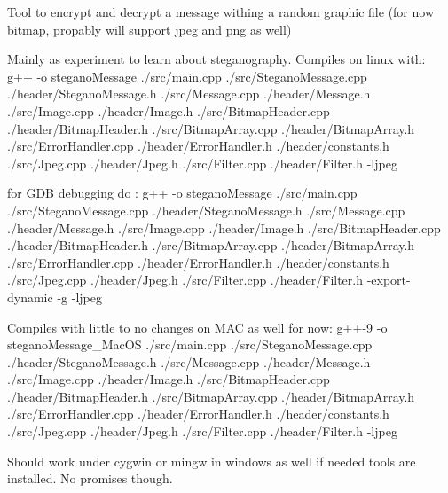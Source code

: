 Tool to encrypt and decrypt a message withing a random graphic file (for now bitmap, propably will support jpeg and png as well)

Mainly as experiment to learn about steganography. Compiles on linux with\+: g++ -\/o stegano\+Message ./src/main.cpp ./src/\+Stegano\+Message.cpp ./header/\+Stegano\+Message.h ./src/\+Message.cpp ./header/\+Message.h ./src/\+Image.cpp ./header/\+Image.h ./src/\+Bitmap\+Header.cpp ./header/\+Bitmap\+Header.h ./src/\+Bitmap\+Array.cpp ./header/\+Bitmap\+Array.h ./src/\+Error\+Handler.cpp ./header/\+Error\+Handler.h ./header/constants.h ./src/\+Jpeg.cpp ./header/\+Jpeg.h ./src/\+Filter.cpp ./header/\+Filter.h -\/ljpeg

for G\+DB debugging do \+: g++ -\/o stegano\+Message ./src/main.cpp ./src/\+Stegano\+Message.cpp ./header/\+Stegano\+Message.h ./src/\+Message.cpp ./header/\+Message.h ./src/\+Image.cpp ./header/\+Image.h ./src/\+Bitmap\+Header.cpp ./header/\+Bitmap\+Header.h ./src/\+Bitmap\+Array.cpp ./header/\+Bitmap\+Array.h ./src/\+Error\+Handler.cpp ./header/\+Error\+Handler.h ./header/constants.h ./src/\+Jpeg.cpp ./header/\+Jpeg.h ./src/\+Filter.cpp ./header/\+Filter.h -\/export-\/dynamic -\/g -\/ljpeg

Compiles with little to no changes on M\+AC as well for now\+: g++-\/9 -\/o stegano\+Message\+\_\+\+Mac\+OS ./src/main.cpp ./src/\+Stegano\+Message.cpp ./header/\+Stegano\+Message.h ./src/\+Message.cpp ./header/\+Message.h ./src/\+Image.cpp ./header/\+Image.h ./src/\+Bitmap\+Header.cpp ./header/\+Bitmap\+Header.h ./src/\+Bitmap\+Array.cpp ./header/\+Bitmap\+Array.h ./src/\+Error\+Handler.cpp ./header/\+Error\+Handler.h ./header/constants.h ./src/\+Jpeg.cpp ./header/\+Jpeg.h ./src/\+Filter.cpp ./header/\+Filter.h -\/ljpeg

Should work under cygwin or mingw in windows as well if needed tools are installed. No promises though. 